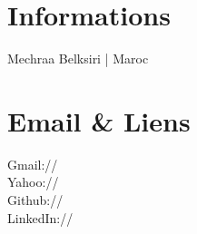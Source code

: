 \documentclass[]{arm-resume}
\begin{document}
%
%



%
%

\begin{minipage}[t]{0.33\textwidth} 


\section{Informations} 


\sectionsep


Mechraa Belksiri | Maroc\\
\sectionsep

\sectionsep


\section{Email \& Liens} 
Gmail://  \href{mailto:omar.arrim@gmail.com}{} \\
Yahoo://  \href{mailto:omar.arrim@yahoo.fr}{} \\
Github:// \href{https://github.com/omarrim}{} \\
LinkedIn://  \href{https://ma.linkedin.com/pub/omar-arrim/51/920/b2}{} \\
\sectionsep




\end{minipage}
\end{document}
